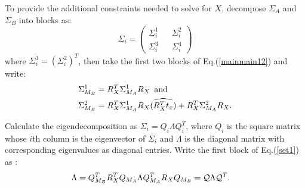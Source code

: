 \documentclass[twocolumn,10pt]{asme2ej}
\begin{document}
To provide the additional constraints needed to solve for $X$, decompose $\Sigma_{A}$ and $\Sigma_{B}$ into blocks as:
$$ \Sigma_{i}= \left(\begin{array}{ccc}
\Sigma_{i}^1 && \Sigma_{i}^2 \\
\Sigma_{i}^3 && \Sigma_{i}^4  \end{array}\right)
$$
where $\Sigma_{i}^3 = (\Sigma_{i}^2)^T$, then take the first two blocks of Eq.(\ref{mainmain12}) and write:
\begin{equation}
\begin{split}
&\Sigma_{M_B}^1 =  R^T_X \Sigma_{M_A}^1 R_X {\rm \,\,\, and \,\,\,} \\
&\Sigma_{M_B}^2 =  R^T_X \Sigma_{M_A}^1 R_X(\widehat{R^T_X t_x}) + R^T_X \Sigma_{M_A}^2 R_X \label{set1}.
\end{split}
\end{equation}

Calculate the eigendecomposition as $ \Sigma_{i}=Q_i \Lambda Q_i^T$, where $Q_i$ is the square matrix whose $i$th column is the eigenvector of $\Sigma_i$ and $\Lambda$ is the diagonal matrix with corresponding eigenvalues as diagonal entries. Write the first block of Eq.(\ref{set1}) as \cite{ackermanGSI, ackermanIROS2013}:
\begin{align}
\Lambda &= Q_{M_B}^T R_X^T Q_{M_A} \Lambda Q_{M_A}^T R_X Q_{M_B} = {\cal Q} \Lambda {\cal Q}^T.
\label{QAQ}
\end{align}

\end{document}
